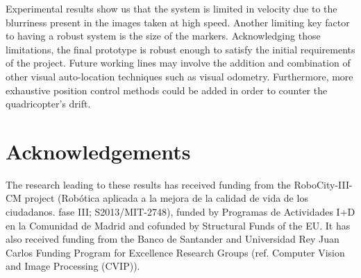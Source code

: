\documentclass{styles/svproc}
\begin{document}
	Experimental results show us that the system is limited in velocity due to the blurriness present in the images taken at high speed. Another limiting key factor to having a robust system is the size of the markers. Acknowledging those limitations, the final prototype is robust enough to satisfy the initial requirements of the project. Future working lines may involve the addition and combination of other visual auto-location techniques such as visual odometry. Furthermore, more exhaustive position control methods could be added in order to counter the quadricopter's drift.


        \section*{Acknowledgements}

        The research leading to these results has received funding from the RoboCity\--III\--CM project (Rob\'otica aplicada a la mejora de la calidad de vida de los ciudadanos. fase III; S2013/MIT-2748), funded by Programas de Actividades I+D en la Comunidad de Madrid and cofunded by Structural Funds of the EU. It has also received funding from
the Banco de Santander and Universidad Rey Juan Carlos Funding Program for Excellence Research Groups (ref. Computer Vision and Image Processing (CVIP)).
\end{document}
